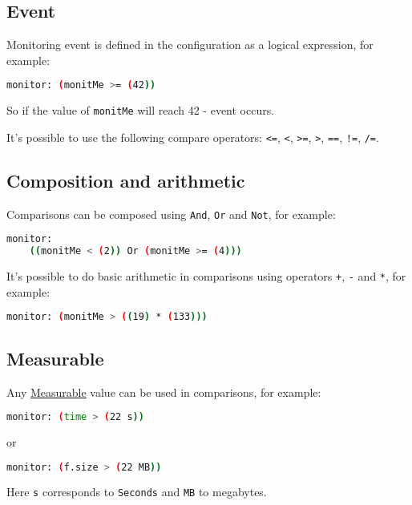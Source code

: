 \begin{mdframed}
\section*{Event}

Monitoring event is defined in the configuration as a logical expression, for example:

\begin{lstlisting}[language=bash]
  monitor: (monitMe >= (42))
\end{lstlisting}

So if the value of \texttt{monitMe} will reach 42 - event occurs.

It's possible to use the following compare operators: \texttt{<=}, \texttt{<}, \texttt{>=}, \texttt{>}, \texttt{==}, \texttt{!=}, \texttt{/=}.

\subsection*{Composition and arithmetic}

Comparisons can be composed using \texttt{And}, \texttt{Or} and \texttt{Not}, for example:

\begin{lstlisting}[language=bash]
  monitor:
    ((monitMe < (2)) Or (monitMe >= (4)))
\end{lstlisting}

It's possible to do basic arithmetic in comparisons using operators \texttt{+}, \texttt{-} and \texttt{*}, for example:

\begin{lstlisting}[language=bash]
  monitor: (monitMe > ((19) * (133)))
\end{lstlisting}
\end{mdframed}

\begin{mdframed}
\section*{Measurable}

Any \href{https://github.com/The-Blockchain-Company/tbco-monitoring-framework/blob/master/tbco-monitoring/src/Bcc/BM/Data/Aggregated.lhs}{Measurable} value can be used in comparisons, for example:

\begin{lstlisting}[language=bash]
  monitor: (time > (22 s))
\end{lstlisting}

or

\begin{lstlisting}[language=bash]
  monitor: (f.size > (22 MB))
\end{lstlisting}

Here \texttt{s} corresponds to \texttt{Seconds} and \texttt{MB} to megabytes.
\end{mdframed}

